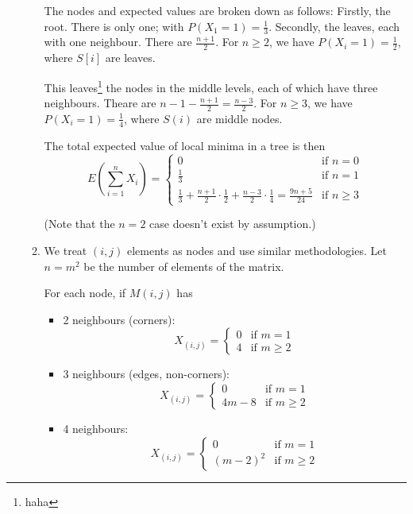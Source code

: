 \documentclass[12pt,a4paper]{article}
\begin{document}
\begin{enumerate}[label=(\alph*)]
\begin{enumerate}[label=(\roman*)]
			The nodes and expected values are broken down as follows:
			Firstly, the root. There is only one; with $P(X_1 = 1) = \frac{1}{3}$. Secondly, the leaves, each with one neighbour. There are $\frac{n + 1}{2}$. For $n \ge 2$, we have $P(X_i = 1) = \frac{1}{2}$, where $S[i]$ are leaves.
			
			This leaves\footnote{haha} the nodes in the middle levels, each of which have three neighbours. Theare are $n - 1 - \frac{n + 1}{2} = \frac{n - 3}{2}$. For $n \ge 3$, we have $P(X_i = 1) = \frac{1}{4}$, where $S(i)$ are middle nodes.

			The total expected value of local minima in a tree is then
			$$
			E(\sum_{i=1}^n X_i) =
			\begin{cases}
				0 & \text{if $n = 0$} \\
				\frac{1}{3} & \text{if $n = 1$} \\
				\frac{1}{3} + \frac{n + 1}{2} \cdot \frac{1}{2}
				+ \frac{n - 3}{2} \cdot \frac{1}{4} = \frac{9n + 5}{24} & \text{if $n \ge 3$}
			\end{cases}
			$$

			(Note that the $n = 2$ case doesn't exist by assumption.)

			\item
			We treat $(i,j)$ elements as nodes and use similar methodologies. Let $n = m^2$ be the number of elements of the matrix.

			For each node, if $M(i, j)$ has
			\begin{itemize}
				\item 2 neighbours (corners): $$
				X_{(i, j)} =
				\begin{cases}
					0 & \text{if } m = 1 \\
					4 & \text{if } m \ge 2
				\end{cases}
				$$

				\item 3 neighbours (edges, non-corners): $$
				X_{(i, j)} =
				\begin{cases}
					0 & \text{if } m = 1 \\
					4m - 8 & \text{if } m \ge 2
				\end{cases}
				$$

				\item 4 neighbours: $$
				X_{(i, j)} =
				\begin{cases}
					0 & \text{if } m = 1 \\
					(m - 2)^2 & \text{if } m \ge 2
				\end{cases}
				$$
			\end{itemize}


\end{enumerate}
\end{enumerate}
\end{document}
